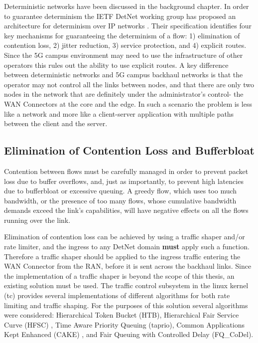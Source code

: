 Deterministic networks have been discussed in the background chapter. In order to guarantee determinism the IETF DetNet working group has proposed an architecture for determinism over IP networks \cite{detnet-arch}. Their specification identifies four key mechanisms for guaranteeing the determinism of a flow: 1) elimination of contention loss, 2) jitter reduction, 3) service protection, and 4) explicit routes. Since the 5G campus environment may need to use the infrastructure of other operators this rules out the ability to use explicit routes. A key difference between deterministic networks and 5G campus backhaul networks is that the operator may not control all the links between nodes, and that there are only two nodes in the network that are definitely under the administrator's control- the WAN Connectors at the core and the edge. In such a scenario the problem is less like a network and more like a client-server application with multiple paths between the client and the server.

\subsection{Elimination of Contention Loss and Bufferbloat}

Contention between flows must be carefully managed in order to prevent packet loss due to buffer overflows, and, just as importantly, to prevent high latencies due to bufferbloat or excessive queuing. A greedy flow, which uses too much bandwidth, or the presence of too many flows, whose cumulative bandwidth demands exceed the link's capabilities, will have negative effects on all the flows running over the link.

Elimination of contention loss can be achieved by using a traffic shaper and/or rate limiter, and the ingress to any DetNet domain \textbf{must} apply such a function. Therefore a traffic shaper should be applied to the ingress traffic entering the WAN Connector from the RAN, before it is sent across the backhaul links. Since the implementation of a traffic shaper is beyond the scope of this thesis, an existing solution must be used. The traffic control subsystem in the linux kernel (tc) provides several implementations of different algorithms for both rate limiting and traffic shaping. For the purposes of this solution several algorithms were considered: Hierarchical Token Bucket (HTB), Hierarchical Fair Service Curve (HFSC) \cite{stoica1997hierarchical}, Time Aware Priority Queuing (taprio), Common Applications Kept Enhanced (CAKE) \cite{hoiland2018piece}, and Fair Queuing with Controlled Delay (FQ\_CoDel).

